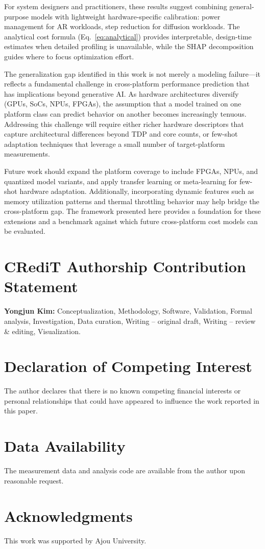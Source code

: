 \documentclass[preprint,review,12pt]{elsarticle}
\begin{document}
For system designers and practitioners, these results suggest combining general-purpose models with lightweight hardware-specific calibration: power management for AR workloads, step reduction for diffusion workloads.
The analytical cost formula (Eq.~\ref{eq:analytical}) provides interpretable, design-time estimates when detailed profiling is unavailable, while the SHAP decomposition guides where to focus optimization effort.

The generalization gap identified in this work is not merely a modeling failure---it reflects a fundamental challenge in cross-platform performance prediction that has implications beyond generative AI.
As hardware architectures diversify (GPUs, SoCs, NPUs, FPGAs), the assumption that a model trained on one platform class can predict behavior on another becomes increasingly tenuous.
Addressing this challenge will require either richer hardware descriptors that capture architectural differences beyond TDP and core counts, or few-shot adaptation techniques that leverage a small number of target-platform measurements.

Future work should expand the platform coverage to include FPGAs, NPUs, and quantized model variants, and apply transfer learning or meta-learning for few-shot hardware adaptation.
Additionally, incorporating dynamic features such as memory utilization patterns and thermal throttling behavior may help bridge the cross-platform gap.
The framework presented here provides a foundation for these extensions and a benchmark against which future cross-platform cost models can be evaluated.

\section*{CRediT Authorship Contribution Statement}

\textbf{Yongjun Kim:} Conceptualization, Methodology, Software, Validation, Formal analysis, Investigation, Data curation, Writing -- original draft, Writing -- review \& editing, Visualization.

\section*{Declaration of Competing Interest}

The author declares that there is no known competing financial interests or personal relationships that could have appeared to influence the work reported in this paper.

\section*{Data Availability}

The measurement data and analysis code are available from the author upon reasonable request.

\section*{Acknowledgments}

This work was supported by Ajou University.



\end{document}
